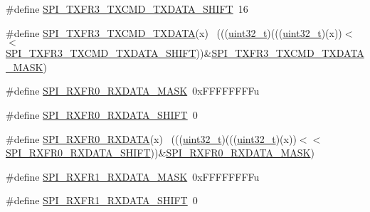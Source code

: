 \begin{DoxyCompactItemize}
\item 
\#define \hyperlink{group___s_p_i___register___masks_ga22a70393315807bfa3480a1892da3531}{S\+P\+I\+\_\+\+T\+X\+F\+R3\+\_\+\+T\+X\+C\+M\+D\+\_\+\+T\+X\+D\+A\+T\+A\+\_\+\+S\+H\+I\+FT}~16
\item 
\#define \hyperlink{group___s_p_i___register___masks_gabede564e52c186605d574c0ede82daf2}{S\+P\+I\+\_\+\+T\+X\+F\+R3\+\_\+\+T\+X\+C\+M\+D\+\_\+\+T\+X\+D\+A\+TA}(x)                            ~(((\hyperlink{_p_e___types_8h_a33594304e786b158f3fb30289278f5af}{uint32\+\_\+t})(((\hyperlink{_p_e___types_8h_a33594304e786b158f3fb30289278f5af}{uint32\+\_\+t})(x))$<$$<$\hyperlink{group___s_p_i___register___masks_ga22a70393315807bfa3480a1892da3531}{S\+P\+I\+\_\+\+T\+X\+F\+R3\+\_\+\+T\+X\+C\+M\+D\+\_\+\+T\+X\+D\+A\+T\+A\+\_\+\+S\+H\+I\+FT}))\&\hyperlink{group___s_p_i___register___masks_ga5db2d61f529d80173f78729f46c098a9}{S\+P\+I\+\_\+\+T\+X\+F\+R3\+\_\+\+T\+X\+C\+M\+D\+\_\+\+T\+X\+D\+A\+T\+A\+\_\+\+M\+A\+SK})
\item 
\#define \hyperlink{group___s_p_i___register___masks_ga61ebb4d00d387b335d5b9d64d024e16f}{S\+P\+I\+\_\+\+R\+X\+F\+R0\+\_\+\+R\+X\+D\+A\+T\+A\+\_\+\+M\+A\+SK}~0x\+F\+F\+F\+F\+F\+F\+F\+Fu
\item 
\#define \hyperlink{group___s_p_i___register___masks_ga030988e177b7d3ab914b5bb4cd734463}{S\+P\+I\+\_\+\+R\+X\+F\+R0\+\_\+\+R\+X\+D\+A\+T\+A\+\_\+\+S\+H\+I\+FT}~0
\item 
\#define \hyperlink{group___s_p_i___register___masks_ga9eb9828d6296f1bee0cdf65c6dc5ecb8}{S\+P\+I\+\_\+\+R\+X\+F\+R0\+\_\+\+R\+X\+D\+A\+TA}(x)                                        ~(((\hyperlink{_p_e___types_8h_a33594304e786b158f3fb30289278f5af}{uint32\+\_\+t})(((\hyperlink{_p_e___types_8h_a33594304e786b158f3fb30289278f5af}{uint32\+\_\+t})(x))$<$$<$\hyperlink{group___s_p_i___register___masks_ga030988e177b7d3ab914b5bb4cd734463}{S\+P\+I\+\_\+\+R\+X\+F\+R0\+\_\+\+R\+X\+D\+A\+T\+A\+\_\+\+S\+H\+I\+FT}))\&\hyperlink{group___s_p_i___register___masks_ga61ebb4d00d387b335d5b9d64d024e16f}{S\+P\+I\+\_\+\+R\+X\+F\+R0\+\_\+\+R\+X\+D\+A\+T\+A\+\_\+\+M\+A\+SK})
\item 
\#define \hyperlink{group___s_p_i___register___masks_gae5778ef350adb171937498b1b49ffdb0}{S\+P\+I\+\_\+\+R\+X\+F\+R1\+\_\+\+R\+X\+D\+A\+T\+A\+\_\+\+M\+A\+SK}~0x\+F\+F\+F\+F\+F\+F\+F\+Fu
\item 
\#define \hyperlink{group___s_p_i___register___masks_gab6747e932cee7cbdab3b46213f8d793b}{S\+P\+I\+\_\+\+R\+X\+F\+R1\+\_\+\+R\+X\+D\+A\+T\+A\+\_\+\+S\+H\+I\+FT}~0
\item 

\end{DoxyCompactItemize}
